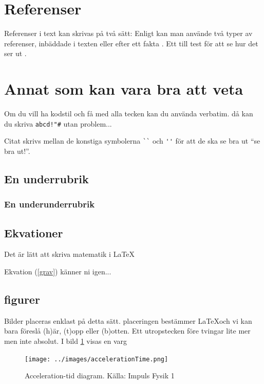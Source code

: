 \documentclass[11p]{article}
\begin{document}

    \section{Referenser}
    Referenser i text kan skrivas på två sätt: Enligt \textcite{Jens} kan man använde två typer av referenser, inbäddade i texten eller efter ett fakta \parencite{Fraenkel}. Ett till test för att se hur det ser ut \parencite[sid 55]{fermi}.

    \section{Annat som kan vara bra att veta}
    Om du vill ha kodstil och få med alla tecken kan du använda verbatim. då kan du skriva \verb|abcd!"#| utan problem...

    Citat skrivs mellan de konstiga symbolerna \verb|``| och \verb|''| för att de ska se bra ut ``se bra ut!''.
    \subsection{En underrubrik}
    \subsubsection{En underunderrubrik}
    \subsection{Ekvationer}
    Det är lätt att skriva matematik i \LaTeX

    Ekvation (\ref{grav}) känner ni igen...

    \subsection{figurer}
    Bilder placeras enklast på detta sätt. placeringen bestämmer \LaTeX och vi kan bara föreslå (h)är, (t)opp eller (b)otten. Ett utropstecken före tvingar lite mer men inte absolut. I bild \ref{varg} visas en varg
    \begin{figure}[!h]
        \texttt{[image: ../images/accelerationTime.png]}
        \caption{Acceleration-tid diagram. Källa: Impuls Fysik 1}
        \label{varg}
    \end{figure}
    \printbibliography
\end{document}
